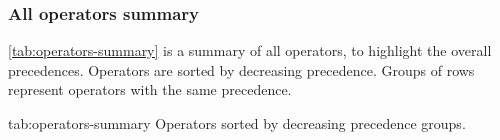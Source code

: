 \subsubsection{All operators summary}

\autoref{tab:operators-summary} is a summary of all operators, to highlight
the overall precedences. Operators are sorted by decreasing
precedence. Groups of rows represent operators with the same precedence.

\begin{operatorTable}[\ifx\ifHtml\undefined\small\fi]%
  {tab:operators-summary}%
  {Operators sorted by decreasing precedence groups.}
  \operatordot\\\operatordota
  \\\hline
  \operatorprop\\\operatorpropass
  \\\hline
  \operatoruand\\\operatordotand
  \\\hline
  \operatorsub\\\operatorsubass
  \\\hline
  \operatorexp
  \\\hline
  \operatorbcompl\\\operatoruplus\\\operatorumin\\\operatorneg
  \\\hline
  \operatormult\\\operatordiv\\\operatormod
  \\\hline
  \operatorplus\\\operatorminus
  \\\hline
  \operatorlshift\\\operatorrshift
  \\\hline
  \operatorband
  \\\hline
  \operatorbxor
  \\\hline
  \operatorbor
  \\\hline
  \operatoreq\\\operatorneq\\\operatorpeq\\\operatorpneq\\\operatoreqaeq\\
  \operatoraeq\\\operatorinf\\\operatorinfeq\\\operatorsup\\\operatorsupeq
  \\\hline
  \operatorin\\\operatornotin
  \\\hline
  \operatorand
  \\\hline
  \operatoror
  \\\hline
  \operatorass\\\operatorsiass
  \\\hline
  \operatorinca\\\operatordeca\\\operatorainc\\\operatoradec
\end{operatorTable}


